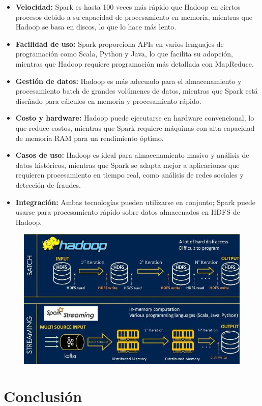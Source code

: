 \documentclass[12pt]{article}
\begin{document}
\begin{itemize}
    \item \textbf{Velocidad:} Spark es hasta 100 veces más rápido que Hadoop en ciertos procesos debido a su capacidad de procesamiento en memoria, mientras que Hadoop se basa en discos, lo que lo hace más lento.
    \item \textbf{Facilidad de uso:} Spark proporciona APIs en varios lenguajes de programación como Scala, Python y Java, lo que facilita su adopción, mientras que Hadoop requiere programación más detallada con MapReduce.
    \item \textbf{Gestión de datos:} Hadoop es más adecuado para el almacenamiento y procesamiento batch de grandes volúmenes de datos, mientras que Spark está diseñado para cálculos en memoria y procesamiento rápido.
    \item \textbf{Costo y hardware:} Hadoop puede ejecutarse en hardware convencional, lo que reduce costos, mientras que Spark requiere máquinas con alta capacidad de memoria RAM para un rendimiento óptimo.
    \item \textbf{Casos de uso:} Hadoop es ideal para almacenamiento masivo y análisis de datos históricos, mientras que Spark se adapta mejor a aplicaciones que requieren procesamiento en tiempo real, como análisis de redes sociales y detección de fraudes.
    \item \textbf{Integración:} Ambas tecnologías pueden utilizarse en conjunto; Spark puede usarse para procesamiento rápido sobre datos almacenados en HDFS de Hadoop.
\end{itemize}

\begin{figure}[h!]
    \centering
    \includegraphics[width=.7\textwidth]{comparativa.jpg}
    \label{fig:my_label}
\end{figure}

\clearpage

\section{Conclusión}
\end{document}
